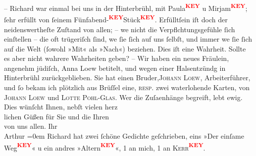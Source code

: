 \begin{ledgroupsized}[t]{13cm}
           \pstart
           – Richard war einmal bei uns in der Hinterbrühl, mit Paula\textcolor{red}{\textsuperscript{\textbf{KEY}}} u Mirjam\textcolor{red}{\textsuperscript{\textbf{KEY}}}; ſehr erfüllt von ſeinem Fünfabend-\textcolor{red}{\textsuperscript{\textbf{KEY}}}Stück\textcolor{red}{\textsuperscript{\textbf{KEY}}}. Erfülltſein iſt doch der
               neidenswertheſte Zuſtand von allen; – we{\geminationn} nicht die
               Verpflchtungsgefühle ſich einſtellen – die oft trügeriſch ſind, we{\geminationn} ſie ſich auf uns ſelbſt, und immer we{\geminationn} ſie ſich auf die Welt (ſowohl »Mit« als »Nach«) {\pb}beziehen. Dies iſt eine Wahrheit.
               Sollte es aber nicht wahrere Wahrheiten geben? \pend
           \pstart
           – Wir haben ein neues Fräulein, angenehm jüdiſch, Anna Loew betitelt, und wegen einer Halsentzündg in Hinterbrühl zurückgeblieben. Sie hat einen Bruder,\textsc{Johann Loew}, Arbeiterführer, und ſo bekam ich plötzlich aus Brüſſel eine, \textsc{resp.} zwei waterlohende Karten, von \textsc{Johann Loew} und \textsc{Lotte Pohl-Glas}. Wer die Zuſa{\geminationm}enhänge begreift, lebt ewig. \pend
           \pstart
            Dies wünſcht Ihnen, nebſt vielen herz {\\}lichen Güßen für Sie und die Ihren
               {\\}von uns allen.\pend
           \pstart
           Ihr {\\[\baselineskip]}\spacefill\mbox{Arthur}\pend
           \leftskip=0em{}\pstart
           Richard hat zwei ſchöne Gedichte geſchrieben,
               eins »Der einſame Weg\textcolor{red}{\textsuperscript{\textbf{KEY}}}« u ein andres »Altern\textcolor{red}{\textsuperscript{\textbf{KEY}}}«, 1 an mich, 1 an \textsc{Kerr\textcolor{red}{\textsuperscript{\textbf{KEY}}}}. \pend
           
         
         \endnumbering{}\end{ledgroupsized}\begin{anhang}\end{anhang}\newcommand{\dateiname}{L03005}\newcommand{\titel}{Arthur Schnitzler an Felix Salten, 16. 5. 1906}\newcommand{\editorInnen}{Martin Anton Müller und Laura Untner}
      